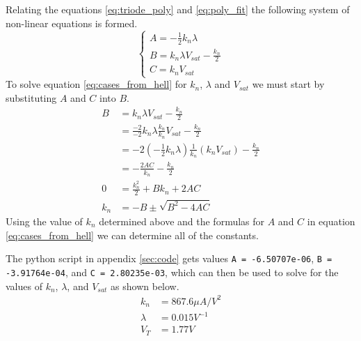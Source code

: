 \documentclass[titlepage, 12pt]{article}
\begin{document}
    Relating the equations \eqref{eq:triode_poly} and
    \eqref{eq:poly_fit} the following system of non-linear equations is
    formed.
    \begin{equation}\label{eq:cases_from_hell}
        \begin{cases}
            A = -\frac{1}{2}k_n\lambda\\
            B = k_n\lambda V_{sat} - \frac{k_n}{2}\\
            C = k_n V_{sat}
        \end{cases}
    \end{equation}
    To solve equation \eqref{eq:cases_from_hell} for $k_n$, $\lambda$
    and $V_{sat}$ we must start by substituting $A$ and $C$ into $B$.
    \begin{align*}
        B &= k_n\lambda V_{sat} - \frac{k_n}{2}\\
        &= \frac{-2}{-2} k_n\lambda \frac{k_n}{k_n}V_{sat} -
        \frac{k_n}{2}\\
        &=-2\left(-\frac{1}{2}k_n\lambda\right)
        \frac{1}{k_n}(k_nV_{sat}) - \frac{k_n}{2}\\
        &= -\frac{2AC}{k_n} - \frac{k_n}{2}\\
        0 &= \frac{k_n^2}{2} + Bk_n + 2AC\\
        k_n &= -B \pm \sqrt{B^2 - 4AC}
    \end{align*}
    Using the value of $k_n$ determined above and the formulas for $A$
    and $C$ in equation \eqref{eq:cases_from_hell} we can determine all
    of the constants.

    The python script in appendix \ref{sec:code} gets values
    \texttt{A = -6.50707e-06}, \texttt{B = -3.91764e-04}, and \texttt{C
    = 2.80235e-03}, which can then be used to solve for the values of
    $k_n$, $\lambda$, and $V_{sat}$ as shown below.
    \begin{align*}
        k_n &= 867.6\mu A/V^2\\
        \lambda &= 0.015 V^{-1}\\
        V_T &= 1.77 V
    \end{align*}
\end{document}

